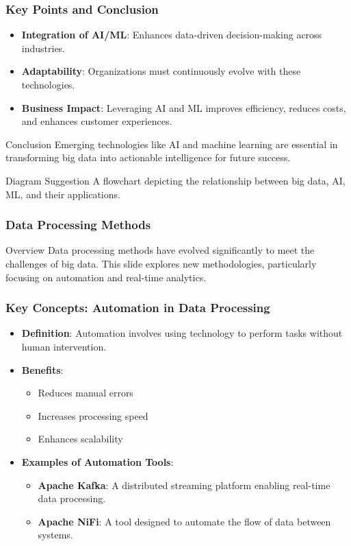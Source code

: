 \documentclass[aspectratio=169]{beamer}
\begin{document}
\begin{frame}[fragile]
    \frametitle{Key Points and Conclusion}
    \begin{itemize}
        \item \textbf{Integration of AI/ML}: Enhances data-driven decision-making across industries.
        \item \textbf{Adaptability}: Organizations must continuously evolve with these technologies.
        \item \textbf{Business Impact}: Leveraging AI and ML improves efficiency, reduces costs, and enhances customer experiences.
    \end{itemize}

    \begin{block}{Conclusion}
        Emerging technologies like AI and machine learning are essential in transforming big data into actionable intelligence for future success.
    \end{block}

    \begin{block}{Diagram Suggestion}
        A flowchart depicting the relationship between big data, AI, ML, and their applications.
    \end{block}
\end{frame}

\begin{frame}[fragile]
    \frametitle{Data Processing Methods}
    \begin{block}{Overview}
        Data processing methods have evolved significantly to meet the challenges of big data.
        This slide explores new methodologies, particularly focusing on automation and real-time analytics.
    \end{block}
\end{frame}

\begin{frame}[fragile]
    \frametitle{Key Concepts: Automation in Data Processing}
    \begin{itemize}
        \item \textbf{Definition}: Automation involves using technology to perform tasks without human intervention.
        \item \textbf{Benefits}:
            \begin{itemize}
                \item Reduces manual errors
                \item Increases processing speed
                \item Enhances scalability
            \end{itemize}
        \item \textbf{Examples of Automation Tools}:
            \begin{itemize}
                \item \textbf{Apache Kafka}: A distributed streaming platform enabling real-time data processing.
                \item \textbf{Apache NiFi}: A tool designed to automate the flow of data between systems.
            \end{itemize}
    \end{itemize}
\end{frame}
\end{document}
